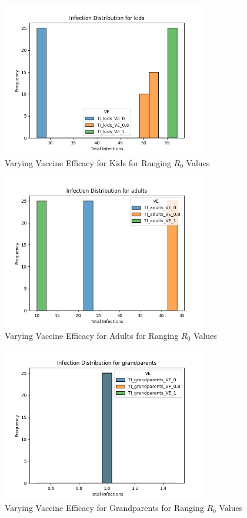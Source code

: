 \documentclass{report}
\begin{document}
\begin{figure}[H]
    \centering
    \includegraphics[width=0.8\textwidth]{kids.png}
    \caption{{Varying Vaccine Efficacy for Kids for Ranging \(R_{0}\) Values}}
    \label{fig:kids} 
\end{figure}
\begin{figure}[H]
    \centering
    \includegraphics[width=0.8\textwidth]{adults.png}
    \caption{Varying Vaccine Efficacy for Adults for Ranging \(R_{0}\) Values} %
    \label{fig:adults} %
\end{figure}
\begin{figure}[H]
    \centering
    \includegraphics[width=0.8\textwidth]{grandparents.png}
    \caption{{Varying Vaccine Efficacy for Grandparents for Ranging \(R_{0}\) Values}}
    \label{fig:grandparents} 
\end{figure}
\end{document}
